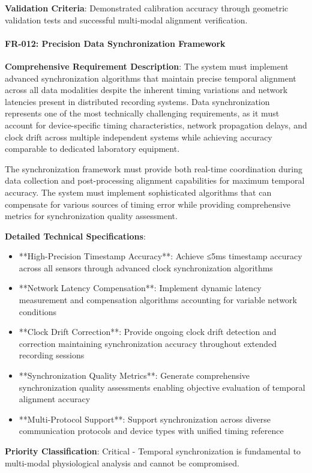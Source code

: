 \documentclass[12pt,a4paper]{report}
\begin{document}
\textbf{Validation Criteria}: Demonstrated calibration accuracy through geometric validation tests and successful multi-modal
alignment verification.

\paragraph{FR-012: Precision Data Synchronization Framework}

\textbf{Comprehensive Requirement Description}: The system must implement advanced synchronization algorithms that maintain
precise temporal alignment across all data modalities despite the inherent timing variations and network latencies
present in distributed recording systems. Data synchronization represents one of the most technically challenging
requirements, as it must account for device-specific timing characteristics, network propagation delays, and clock drift
across multiple independent systems while achieving accuracy comparable to dedicated laboratory equipment.

The synchronization framework must provide both real-time coordination during data collection and post-processing
alignment capabilities for maximum temporal accuracy. The system must implement sophisticated algorithms that can
compensate for various sources of timing error while providing comprehensive metrics for synchronization quality
assessment.

\textbf{Detailed Technical Specifications}:

\begin{itemize}
\item **High-Precision Timestamp Accuracy**: Achieve ≤5ms timestamp accuracy across all sensors through advanced clock
  synchronization algorithms
\item **Network Latency Compensation**: Implement dynamic latency measurement and compensation algorithms accounting for
  variable network conditions
\item **Clock Drift Correction**: Provide ongoing clock drift detection and correction maintaining synchronization accuracy
  throughout extended recording sessions
\item **Synchronization Quality Metrics**: Generate comprehensive synchronization quality assessments enabling objective
  evaluation of temporal alignment accuracy
\item **Multi-Protocol Support**: Support synchronization across diverse communication protocols and device types with
  unified timing reference

\end{itemize}
\textbf{Priority Classification}: Critical - Temporal synchronization is fundamental to multi-modal physiological analysis
and cannot be compromised.
\end{document}
